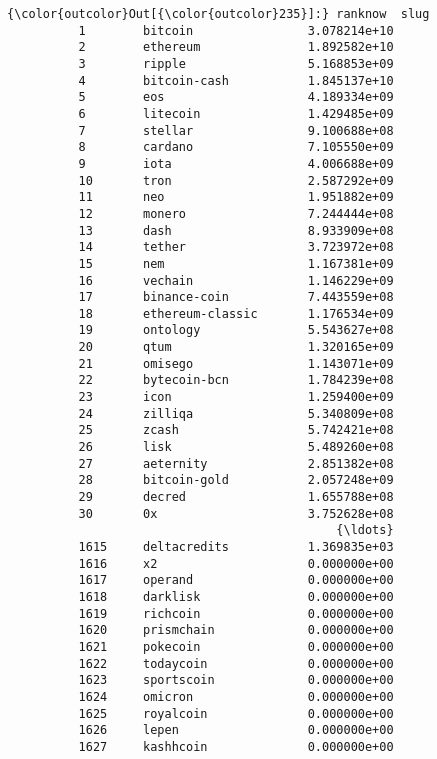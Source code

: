 \documentclass[11pt]{article}
\begin{document}
\begin{Verbatim}[commandchars=\\\{\}]
{\color{outcolor}Out[{\color{outcolor}235}]:} ranknow  slug               
          1        bitcoin                3.078214e+10
          2        ethereum               1.892582e+10
          3        ripple                 5.168853e+09
          4        bitcoin-cash           1.845137e+10
          5        eos                    4.189334e+09
          6        litecoin               1.429485e+09
          7        stellar                9.100688e+08
          8        cardano                7.105550e+09
          9        iota                   4.006688e+09
          10       tron                   2.587292e+09
          11       neo                    1.951882e+09
          12       monero                 7.244444e+08
          13       dash                   8.933909e+08
          14       tether                 3.723972e+08
          15       nem                    1.167381e+09
          16       vechain                1.146229e+09
          17       binance-coin           7.443559e+08
          18       ethereum-classic       1.176534e+09
          19       ontology               5.543627e+08
          20       qtum                   1.320165e+09
          21       omisego                1.143071e+09
          22       bytecoin-bcn           1.784239e+08
          23       icon                   1.259400e+09
          24       zilliqa                5.340809e+08
          25       zcash                  5.742421e+08
          26       lisk                   5.489260e+08
          27       aeternity              2.851382e+08
          28       bitcoin-gold           2.057248e+09
          29       decred                 1.655788e+08
          30       0x                     3.752628e+08
                                              {\ldots}     
          1615     deltacredits           1.369835e+03
          1616     x2                     0.000000e+00
          1617     operand                0.000000e+00
          1618     darklisk               0.000000e+00
          1619     richcoin               0.000000e+00
          1620     prismchain             0.000000e+00
          1621     pokecoin               0.000000e+00
          1622     todaycoin              0.000000e+00
          1623     sportscoin             0.000000e+00
          1624     omicron                0.000000e+00
          1625     royalcoin              0.000000e+00
          1626     lepen                  0.000000e+00
          1627     kashhcoin              0.000000e+00

\end{Verbatim}
\end{document}
